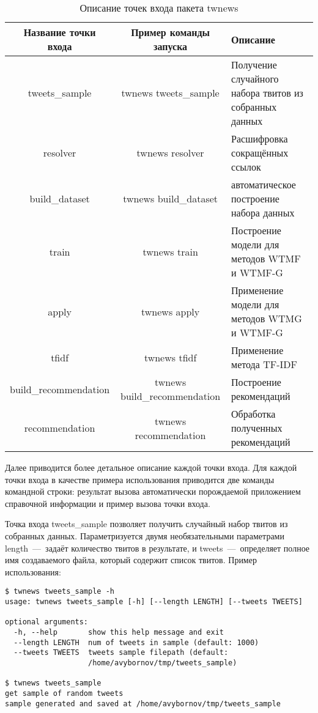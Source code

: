          \begin{table}[h!]
            \small
            \caption{Описание точек входа пакета twnews \bigskip}
            \center

            \label{tabular:entry_point}
            \begin{tabular}{|c|c|m{7cm}|}
                \hline
                \bf{Название точки входа} & \bf{Пример команды запуска} & \bf{Описание} \\ \hline
                tweets\_sample & twnews tweets\_sample & Получение случайного набора твитов из собранных данных \\ \hline
                resolver & twnews resolver & Расшифровка сокращённых ссылок \\ \hline
                build\_dataset & twnews build\_dataset & автоматическое построение набора данных \\ \hline
                train & twnews train & Построение модели для методов WTMF и WTMF-G \\ \hline
                apply & twnews apply & Применение модели для методов WTMG и WTMF-G \\ \hline
                tfidf & twnews tfidf & Применение метода TF-IDF \\ \hline
                build\_recommendation & twnews build\_recommendation & Построение рекомендаций \\ \hline
                recommendation & twnews recommendation & Обработка полученных рекомендаций \\ \hline
            \end{tabular}
        \end{table}
        Далее приводится более детальное описание каждой точки входа. Для каждой точки входа в качестве примера использования
        приводится две команды командной строки: результат вызова автоматически порождаемой приложением справочной информации и пример вызова точки входа.


        Точка входа tweets\_sample позволяет получить случайный набор твитов из собранных данных. Параметризуется двумя необязательными параметрами
        length~---~задаёт количество твитов в результате, и tweets~---~определяет полное имя создаваемого файла, который содержит список твитов.
        Пример использования:
        \begin{lstlisting}
$ twnews tweets_sample -h
usage: twnews tweets_sample [-h] [--length LENGTH] [--tweets TWEETS]

optional arguments:
  -h, --help       show this help message and exit
  --length LENGTH  num of tweets in sample (default: 1000)
  --tweets TWEETS  tweets sample filepath (default:
                   /home/avybornov/tmp/tweets_sample)

$ twnews tweets_sample
get sample of random tweets
sample generated and saved at /home/avybornov/tmp/tweets_sample
        \end{lstlisting}

